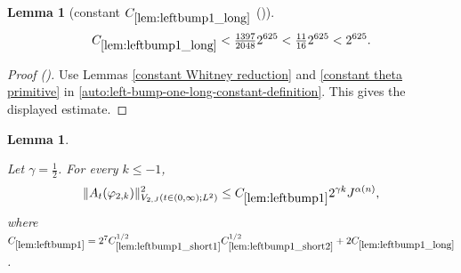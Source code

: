 \documentclass[12pt,reqno]{amsart}
\newcommand{\auto}{{({\tiny\faCar})}}
\theoremstyle{plain}
\newtheorem{lemma}[theorem]{Lemma}
\numberwithin{equation}{section}
\theoremstyle{remark}
\newcommand{\uses}[1]{}
\newcommand{\usesdefs}[1]{}
\begin{document}
\begin{lemma}[constant $C_{\ref{lem:leftbump1_long}}$ \auto]\label{constant left bump one long}\uses{constant Whitney reduction,constant theta primitive,lem:leftbump1_long}\usesdefs{}
\begin{equation}\label{constant left bump one long bound}
C_{\ref{lem:leftbump1_long}}<\tfrac{1397}{2048}2^{625}<\tfrac{11}{16}2^{625}<2^{625}.
\end{equation}
\end{lemma}
\begin{proof}[Proof \auto]
Use Lemmas \ref{constant Whitney reduction} and \ref{constant theta primitive} in \eqref{auto:left-bump-one-long-constant-definition}. This gives the displayed estimate.
\end{proof}


\begin{lemma}\label{lem:leftbump1}\uses{lem:rescaling,lem:shortlongjumps,lem:leftbump1_long,lem:leftbump1_short1,lem:leftbump1_short2,lem:ftccs-R,lem:ftc_ATphi}\usesdefs{A_def,defn:window based bump functions}

Let $\gamma=\frac12$. For every $k\le -1$,
\begin{equation}\label{leftbump1}
\|A_{t}(\varphi_{2,k})\|_{V_{2,J}(t\in(0,\infty);L^2)}^2  \le C_{\ref{lem:leftbump1}} 2^{\gamma k} J^{\alpha(n)}, \end{equation}
where  $C_{\ref{lem:leftbump1}}
=2^7C_{\ref{lem:leftbump1_short1}}^{1/2}C_{\ref{lem:leftbump1_short2}}^{1/2}
+2C_{\ref{lem:leftbump1_long}}$.
\end{lemma}
\end{document}
